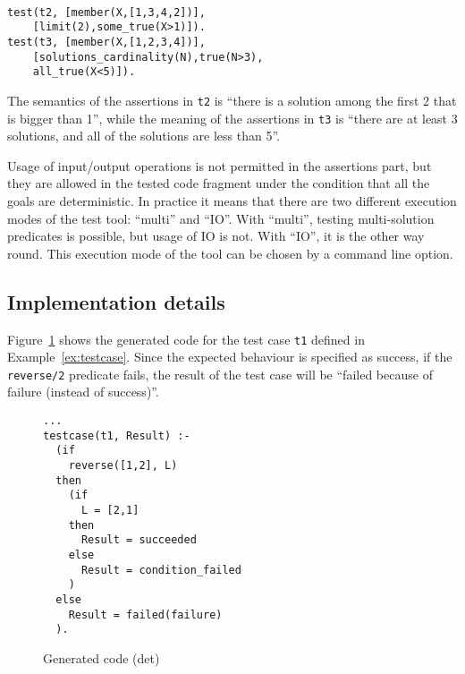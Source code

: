\documentclass[british]{llncs}
\begin{document}
\begin{example}\label{ex:testcases2}\ \\
\vspace*{-0.5 cm}
\begin{lstlisting}[basicstyle={\ttfamily},breaklines=true,tabsize=4]
test(t2, [member(X,[1,3,4,2])], 
	[limit(2),some_true(X>1)]).
test(t3, [member(X,[1,2,3,4])], 
	[solutions_cardinality(N),true(N>3),
	all_true(X<5)]).
\end{lstlisting}

The
semantics of the assertions in \texttt{t2} is \textquotedblleft{}there
is a solution among the first 2 that is bigger than 1\textquotedblright{},
while the meaning of the assertions in \texttt{t3} is \textquotedblleft{}there
are at least 3 solutions, and all of the solutions are less than 5\textquotedblright{}.

\end{example}

Usage of input/output operations is not permitted in the assertions part, but they are allowed in the tested code fragment under the condition that
 all the goals are deterministic. In practice it means that there are two different
execution modes of the test tool: {}``multi'' and {}``IO''. With
{}``multi'', testing multi-solution predicates is possible, but
usage of IO is not. With {}``IO'', it is the other way round. This
execution mode of the tool can be chosen by a command line option.


\subsection{Implementation details}

Figure~\ref{fig:Generated-code-det} shows the generated code for
the test case \texttt{t1} defined in Example~\ref{ex:testcase}. Since the expected behaviour
is specified as success, if the \texttt{reverse/2} predicate fails, the result of the test case will be {}``failed
because of failure (instead of success)''.

\begin{figure}[h]
{\scriptsize 
\begin{lstlisting}[basicstyle={\small\ttfamily},breaklines=true]
...
testcase(t1, Result) :-
  (if
    reverse([1,2], L)
  then
    (if 
      L = [2,1]
    then
      Result = succeeded
    else
      Result = condition_failed
    )
  else
    Result = failed(failure)
  ).
\end{lstlisting}
}\caption{\label{fig:Generated-code-det}Generated code (det)}

\end{figure}
\end{document}
